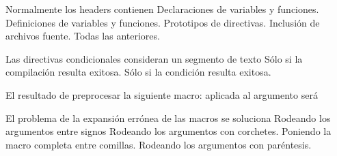 \begin{preguntas}
\question Normalmente los headers contienen
\correctchoice Declaraciones de variables y funciones.
\choice Definiciones de variables y funciones.
\choice Prototipos de directivas.
\choice Inclusión de archivos fuente.
\choice Todas las anteriores.

\question Las directivas condicionales consideran un segmento de texto
\choice Sólo si la compilación resulta exitosa.
\correctchoice Sólo si la condición resulta exitosa.

\question El resultado de preprocesar la siguiente macro:  aplicada al argumento  será 
\choice {}
\correctchoice {}
\choice {}
\choice {}

\question El problema de la expansión errónea de las macros se soluciona 
\choice Rodeando los argumentos entre signos \code{\<\>}
\choice Rodeando los argumentos con corchetes.
\choice Poniendo la macro completa entre comillas.
\correctchoice Rodeando los argumentos con paréntesis.
\end{preguntas}
